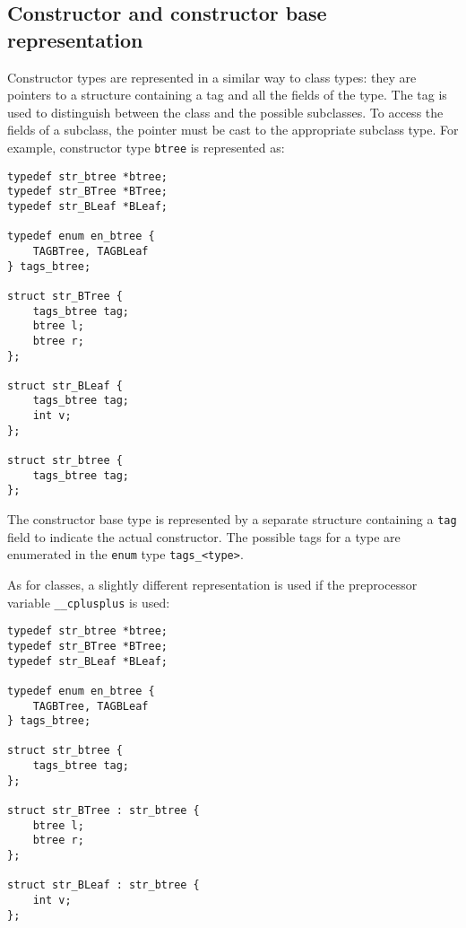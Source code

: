 \subsection{Constructor and constructor base representation}
Constructor types are represented in a similar way to class types:
they are pointers to a structure containing
a tag and all the fields of the type.
The tag is used to distinguish between the class and the possible
subclasses. To access the fields of a subclass, the pointer must
be cast to the appropriate subclass type.
For example, constructor type \texttt{btree} is represented as:
\begin{showfile}
\begin{verbatim}
typedef str_btree *btree;
typedef str_BTree *BTree;
typedef str_BLeaf *BLeaf;

typedef enum en_btree {
    TAGBTree, TAGBLeaf
} tags_btree;

struct str_BTree {
    tags_btree tag;
    btree l;
    btree r;
};

struct str_BLeaf {
    tags_btree tag;
    int v;
};

struct str_btree {
    tags_btree tag;
};
\end{verbatim}
\end{showfile}
The constructor base type is represented by a separate structure containing
a \texttt{tag} field to indicate the actual constructor.
The possible tags for a type are enumerated in the \texttt{enum} type
\texttt{tags\_<type>}.
\par
As for classes, a slightly different representation is used if
the preprocessor variable \verb'__cplusplus' is used:
\begin{showfile}
\begin{verbatim}
typedef str_btree *btree;
typedef str_BTree *BTree;
typedef str_BLeaf *BLeaf;

typedef enum en_btree {
    TAGBTree, TAGBLeaf
} tags_btree;

struct str_btree {
    tags_btree tag;
};

struct str_BTree : str_btree {
    btree l;
    btree r;
};

struct str_BLeaf : str_btree {
    int v;
};
\end{verbatim}
\end{showfile}
